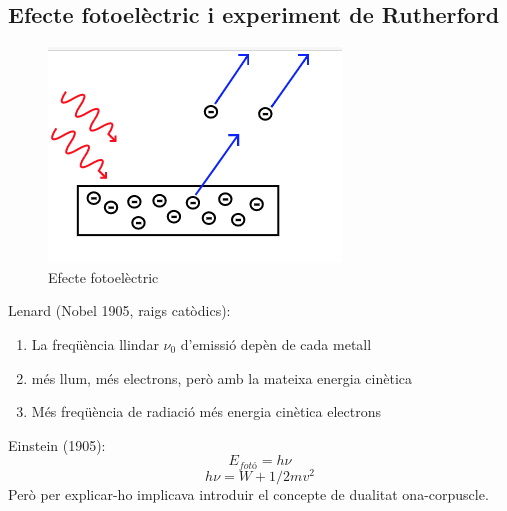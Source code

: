 \subsection{Efecte fotoelèctric i experiment de Rutherford}
\begin{figure}[h]
\centering
\includegraphics[scale=1.5]{figures/photoelect.png}
\caption{Efecte fotoelèctric}
\label{fig:photoelect}
\end{figure}
Lenard (Nobel 1905, raigs catòdics):
\begin{enumerate}
\item La freqüència llindar $\nu_0$ d'emissió depèn de cada metall
\item més llum, més electrons, però amb la mateixa energia cinètica
\item Més freqüència de radiació més energia cinètica electrons
\end{enumerate}
Einstein (1905):
\[
E_{fotó}=h \nu
\]
\[
h\nu = W + 1/2 m v^2
\]
Però per explicar-ho implicava introduir el concepte de dualitat ona-corpuscle.

